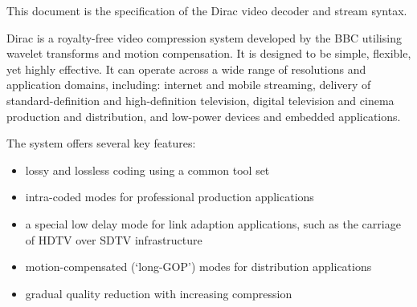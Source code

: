 
This document is the specification of the Dirac video decoder and stream syntax.

Dirac is a royalty-free video compression system developed by the BBC 
utilising wavelet transforms and motion
compensation. It is designed to be simple, flexible, yet highly effective. 
It can operate across a wide range of resolutions and
application domains, including: internet and mobile streaming, delivery of 
standard-definition and high-definition
television, digital television and cinema production and distribution,
and low-power devices and embedded applications.

The system offers several key features:
\begin{itemize}
\item lossy and lossless coding using a common tool set
\item intra-coded modes for professional production applications
\item a special low delay mode for link adaption applications, such as the carriage of HDTV
over SDTV infrastructure
 \item motion-compensated (`long-GOP') modes for distribution applications
\item gradual quality reduction with increasing compression 
\end{itemize}


